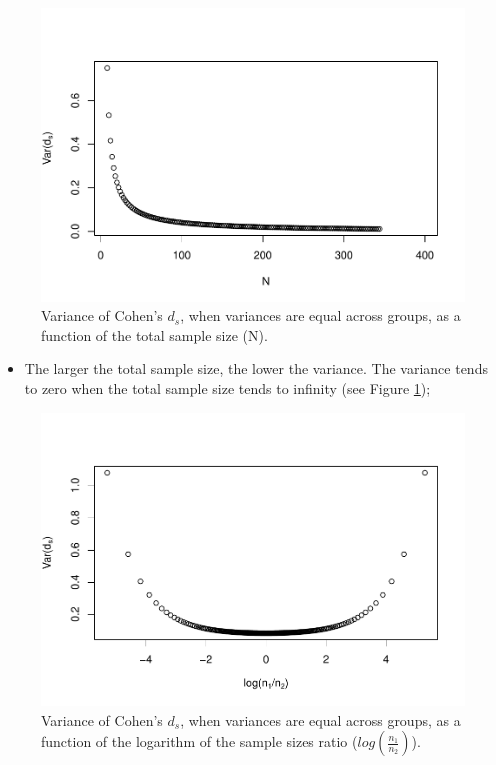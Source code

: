 \documentclass[
  man]{apa6}
\providecommand{\tightlist}{%
  \setlength{\itemsep}{0pt}\setlength{\parskip}{0pt}}
\begin{document}
\begin{figure}
\centering
\includegraphics{Theoretical-Variance-of-all-estimators-as-a-function-of-population-parameters_files/figure-latex/varcohendNsize2-1.pdf}
\caption{\label{fig:varcohendNsize2}Variance of Cohen's \(d_s\), when variances are equal across groups, as a function of the total sample size (N).}
\end{figure}

\begin{itemize}
\tightlist
\item
  The larger the total sample size, the lower the variance. The variance tends to zero when the total sample size tends to infinity (see Figure \ref{fig:varcohendNsize2});
\end{itemize}

\begin{figure}
\centering
\includegraphics{Theoretical-Variance-of-all-estimators-as-a-function-of-population-parameters_files/figure-latex/varcohenNratio2-1.pdf}
\caption{\label{fig:varcohenNratio2}Variance of Cohen's \(d_s\), when variances are equal across groups, as a function of the logarithm of the sample sizes ratio (\(log\left(\frac{n_1}{n_2} \right)\)).}
\end{figure}
\end{document}
